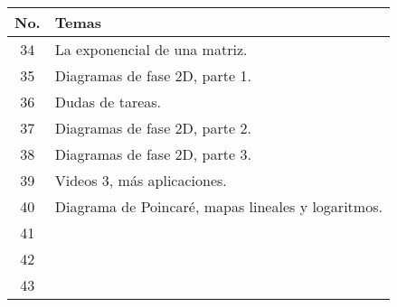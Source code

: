\begin{table}[H]
	\centering
	\begin{tabular}{||c|p{13cm}||}
		\hline
		\hline
			No. & Temas \\
		\hline
		\hline
			34 & La exponencial de una matriz. \\
			35 & Diagramas de fase 2D, parte 1. \\
			36 & Dudas de tareas. \\
			37 & Diagramas de fase 2D, parte 2. \\
			38 & Diagramas de fase 2D, parte 3. \\
			39 & Videos 3, más aplicaciones. \\
			40 & Diagrama de Poincaré, mapas lineales y logaritmos. \\
			41 &  \\
			42 &  \\
			43 &  \\
		\hline
		\hline
	\end{tabular}
\end{table}






